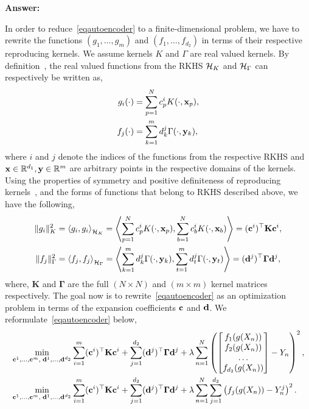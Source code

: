 
{\bf Answer:}

In order to reduce~\eqref{eqautoencoder} to a finite-dimensional problem, we have to rewrite the functions $(g_1,\dots,g_m)$ and $(f_1,\dots,f_{d_2})$ in terms of their respective reproducing kernels. We assume kernels $K$ and $\Gamma$ are real valued kernels. By definition~\cite[Chapter 2.3]{fasshauer2015kernel}, the real valued functions from the RKHS $\mathcal{H}_K$ and $\mathcal{H}_\Gamma$ can respectively be written as,
\begin{align}
g_i(\cdot) &= \sum\limits_{p=1}^{N} c^i_p K(\cdot, \mathbf{x}_p), \\
f_j(\cdot) &= \sum\limits_{k=1}^{m} d^j_k \Gamma(\cdot, \mathbf{y}_k),
\end{align}
where $i$ and $j$ denote the indices of the functions from the respective RKHS and $\mathbf{x} \in \mathbb{R}^{d_1}, \mathbf{y} \in \mathbb{R}^m$ are arbitrary points in the respective domains of the kernels. Using the properties of symmetry and positive definiteness of reproducing kernels~\cite[Chapter 2.3]{fasshauer2015kernel}, and the forms of functions that belong to RKHS described above, we have the following,
\begin{align}
\|g_i\|_K^2 &= \left\langle g_i, g_i \right\rangle_{\mathcal{H}_K} = \left\langle \sum\limits_{p=1}^{N} c^i_p K(\cdot, \mathbf{x}_p), \sum\limits_{b=1}^{N} c^i_b K(\cdot, \mathbf{x}_b) \right\rangle =  (\mathbf{c}^i)^\top \mathbf{K} \mathbf{c}^i, \\
\|f_j\|_\Gamma^2 &= \left\langle f_j, f_j \right\rangle_{\mathcal{H}_\Gamma} = \left\langle \sum\limits_{k=1}^{m} d^j_k \Gamma(\cdot, \mathbf{y}_k), \sum\limits_{t=1}^{m} d^j_t \Gamma(\cdot, \mathbf{y}_t) \right\rangle =  (\mathbf{d}^j)^\top \mathbf{\Gamma} \mathbf{d}^j,
\end{align}
where, $\mathbf{K}$ and $\mathbf{\Gamma}$ are the full $(N\times N)$ and $(m\times m)$ kernel matrices respectively. The goal now is to rewrite~\eqref{eqautoencoder} as an optimization problem in terms of the expansion coefficients $\mathbf{c}$ and $\mathbf{d}$. We reformulate~\eqref{eqautoencoder} below,
\begin{align}
&\min_{\mathbf{c}^1,\ldots,\mathbf{c}^m,\; \mathbf{d}^1,\ldots,\mathbf{d}^{d_2}} 
\sum_{i=1}^m (\mathbf{c}^i)^\top \mathbf{K} \mathbf{c}^i
+ \sum_{j=1}^{d_2} (\mathbf{d}^j)^\top \mathbf{\Gamma} \mathbf{d}^j
+ \lambda \sum\limits_{n=1}^{N} \left( \begin{bmatrix}
f_1(g(X_n)) \\ 
f_2(g(X_n)) \\ 
\dots \\
f_{d_2}(g(X_n))
\end{bmatrix} - Y_n \right)^2, \\
&\min_{\mathbf{c}^1,\ldots,\mathbf{c}^m,\; \mathbf{d}^1,\ldots,\mathbf{d}^{d_2}} 
\sum_{i=1}^m (\mathbf{c}^i)^\top \mathbf{K} \mathbf{c}^i
+ \sum_{j=1}^{d_2} (\mathbf{d}^j)^\top \mathbf{\Gamma} \mathbf{d}^j
+ \lambda \sum\limits_{n=1}^N \sum\limits_{j=1}^{d_2} \left( f_j(g(X_n)) - Y^j_n \right)^2. \label{eq:sumexpansion}
\end{align}
